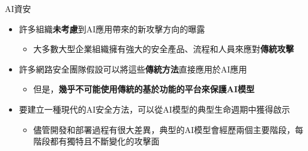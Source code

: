\documentclass[aspectratio=1610]{Common/MyCourseBeamer}
\begin{document}
\begin{frame}[allowframebreaks]{AI資安}
	
	\begin{itemize}
		\item 許多組織\textbf{未考慮}到AI應用帶來的新攻擊方向的曝露
		\begin{itemize}
			\item 大多數大型企業組織擁有強大的安全產品、流程和人員來應對\textbf{傳統攻擊}
		\end{itemize}
		
		
		\item 許多網路安全團隊假設可以將這些\textbf{傳統方法}直接應用於AI應用
		\begin{itemize}
			\item 但是，\textbf{幾乎不可能使用傳統的基於功能的平台來保護AI模型}
		\end{itemize}
		
		\item 要建立一種現代的AI安全方法，可以從AI模型的典型生命週期中獲得啟示
		\begin{itemize}
			\item 儘管開發和部署過程有很大差異，典型的AI模型會經歷兩個主要階段，每階段都有獨特且不斷變化的攻擊面
		\end{itemize}
		
	\end{itemize}
	
	
\end{frame}
\end{document}
